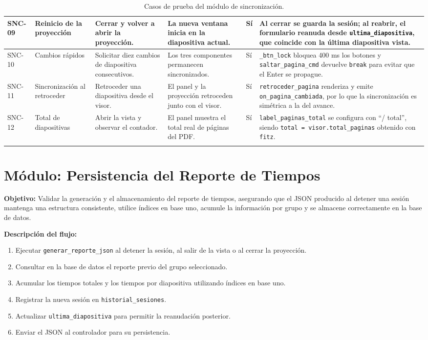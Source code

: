 \documentclass[12pt,letterpaper]{article}
\begin{document}
{\begin{longtable}{|L{1.1cm}|L{2.3cm}|L{3.2cm}|L{3.6cm}|L{1.2cm}|L{3.6cm}|}
SNC-09 & Reinicio de la proyección & Cerrar y volver a abrir la proyección. & La nueva ventana inicia en la diapositiva actual. & Sí & Al cerrar se guarda la sesión; al reabrir, el formulario reanuda desde \texttt{ultima\_diapositiva}, que coincide con la última diapositiva vista. \\ \hline
SNC-10 & Cambios rápidos & Solicitar diez cambios de diapositiva consecutivos. & Los tres componentes permanecen sincronizados. & Sí & \texttt{\_btn\_lock} bloquea 400 ms los botones y \texttt{saltar\_pagina\_cmd} devuelve \texttt{break} para evitar que el Enter se propague. \\ \hline
SNC-11 & Sincronización al retroceder & Retroceder una diapositiva desde el visor. & El panel y la proyección retroceden junto con el visor. & Sí & \texttt{retroceder\_pagina} renderiza y emite \texttt{on\_pagina\_cambiada}, por lo que la sincronización es simétrica a la del avance. \\ \hline
SNC-12 & Total de diapositivas & Abrir la vista y observar el contador. & El panel muestra el total real de páginas del PDF. & Sí & \texttt{label\_paginas\_total} se configura con ``/ total'', siendo \texttt{total = visor.total\_paginas} obtenido con \texttt{fitz}. \\ \hline
\caption{Casos de prueba del módulo de sincronización.}
\label{tab:casos-prueba-modulo-sincronizacion}
\end{longtable}
}

\clearpage
\section*{Módulo: Persistencia del Reporte de Tiempos}

\textbf{Objetivo:} Validar la generación y el almacenamiento del reporte de tiempos, asegurando que el JSON producido al detener una sesión mantenga una estructura consistente, utilice índices en base uno, acumule la información por grupo y se almacene correctamente en la base de datos.

\textbf{Descripción del flujo:}
\begin{enumerate}
    \item Ejecutar \texttt{generar\_reporte\_json} al detener la sesión, al salir de la vista o al cerrar la proyección.
    \item Consultar en la base de datos el reporte previo del grupo seleccionado.
    \item Acumular los tiempos totales y los tiempos por diapositiva utilizando índices en base uno.
    \item Registrar la nueva sesión en \texttt{historial\_sesiones}.
    \item Actualizar \texttt{ultima\_diapositiva} para permitir la reanudación posterior.
    \item Enviar el JSON al controlador para su persistencia.
\end{enumerate}
\end{document}
